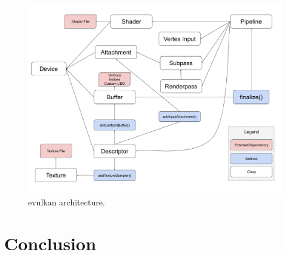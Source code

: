 \documentclass[12pt]{report}
\theoremstyle{definition}
\begin{document}
  \begin{figure}[h]
    \centering
    \includegraphics[width=\textwidth]{images/evk_architecture.png}
    \caption{evulkan architecture.}
    \label{fig:evulkan_architecture}  
  \end{figure}

  \chapter{Conclusion}
\end{document}
